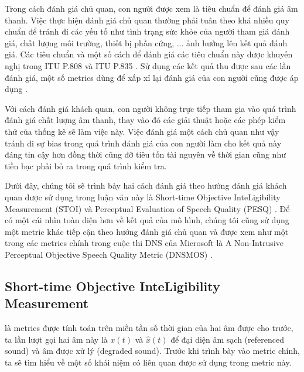 		 Trong cách đánh giá chủ quan, con người được xem là tiêu chuẩn để đánh giá âm thanh. Việc thực hiện đánh giá chủ quan thường phải tuân theo khá nhiều quy chuẩn để tránh đi các yếu tố như tình trạng sức khỏe của người tham giá đánh giá, chất lượng môi trường, thiết bị phần cứng, ... ảnh hưởng lên kết quả đánh giá. Các tiêu chuẩn và một số cách để đánh giá các tiêu chuẩn này được khuyến nghị trong ITU P.808 \cite{itu_p808} và ITU P.835 \cite{itu_p835}. Sử dụng các kết quả thu được sau các lần đánh giá, một số metrics dùng để xấp xỉ lại đánh giá của con người cũng được áp dụng \cite{dnsmos, dnsmos_p835}. 
		
		 Với cách đánh giá khách quan, con người không trực tiếp tham gia vào quá trình đánh giá chất lượng âm thanh, thay vào đó các giải thuật hoặc các phép kiểm thử của thống kê sẽ làm việc này. Việc đánh giá một cách chủ quan như vậy tránh đi sự bias trong quá trình đánh giá của con người làm cho kết quả này đáng tin cậy hơn đồng thời cũng đỡ tiêu tốn tài nguyên về thời gian cũng như tiền bạc phải bỏ ra trong quá trình kiểm tra.
		
		Dưới đây, chúng tôi sẽ trình bày hai cách đánh giá theo hướng đánh giá khách quan được sử dụng trong luận văn này là Short-time Objective InteLigibility Measurement (STOI) \cite{stoi} và Perceptual Evaluation of Speech Quality (PESQ) \cite{pesq}. Để có một cái nhìn toàn diện hơn về kết quả của mô hình, chúng tôi cũng sử dụng một metric khác tiếp cận theo hướng đánh giá chủ quan và được xem như một trong các metrics chính trong cuộc thi DNS \cite{dns} của Microsoft là A Non-Intrusive Perceptual Objective Speech Quality Metric (DNSMOS) \cite{dnsmos, dnsmos_p835}.
	
	\subsection{Short-time Objective InteLigibility Measurement}
		
		 \cite{stoi} là metrics được tính toán trên miền tần số thời gian của hai âm được cho trước, ta lần lượt gọi hai âm này là $x(t)$ và $\hat{x}(t)$ để đại diện âm sạch (referenced sound) và âm được xử lý (degraded sound). Trước khi trình bày vào metric chính, ta sẽ tìm hiểu về một số khái niệm có liên quan được sử dụng trong metric này.
		
			
